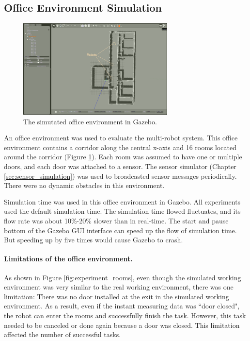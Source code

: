 \subsection{Office Environment Simulation}


\begin{figure}
  \centering
  \includegraphics[width = 0.7\textwidth]{content/images/ch5/gazebo_gui_environment.png}
  \caption{The simutated office environment in Gazebo.}
  \label{fig:gazebo_simulated_office}
\end{figure}

An office environment was used to evaluate the multi-robot system. This office environment contains a corridor along the central x-axis and 16 rooms located around the corridor (Figure \ref{fig:gazebo_simulated_office}). Each room was assumed to have one or multiple doors, and each door was attached to a sensor. The sensor simulator (Chapter \ref{sec:sensor_simulation}) was used to broadcasted sensor messages periodically. There were no dynamic obstacles in this environment.

Simulation time was used in this office environment in Gazebo. All experiments used the default simulation time. The simulation time flowed fluctuates, and its flow rate was about 10\%-20\% slower than in real-time. The start and pause bottom of the Gazebo GUI interface can speed up the flow of simulation time. But speeding up by five times would cause Gazebo to crash.

\paragraph{Limitations of the office environment.} As shown in Figure 
\ref{fig:experiment_rooms}, even though the simulated working environment was very similar to the real working environment, there was one limitation: There was no door installed at the exit in the simulated working environment. As a result, even if the instant measuring data was ``door closed", the robot can enter the rooms and successfully finish the task. However, this task needed to be canceled or done again because a door was closed. This limitation affected the number of successful tasks. 

